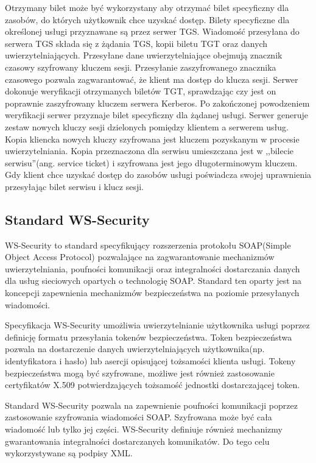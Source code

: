 			Otrzymany bilet może być wykorzystany aby otrzymać bilet specyficzny dla zasobów, do których użytkownik chce uzyskać dostęp. Bilety specyficzne dla określonej usługi przyznawane są przez serwer TGS. Wiadomość przesyłana do serwera TGS składa się z żądania TGS, kopii biletu TGT oraz danych uwierzytelniających. Przesyłane dane uwierzytelniające obejmują znacznik czasowy szyfrowany kluczem sesji. Przesyłanie zaszyfrowanego znacznika czasowego pozwala zagwarantować, że klient ma dostęp do klucza sesji. Serwer dokonuje weryfikacji otrzymanych biletów TGT, sprawdzając czy jest on poprawnie zaszyfrowany kluczem serwera Kerberos. Po zakończonej powodzeniem weryfikacji serwer przyznaje bilet specyficzny dla żądanej usługi. Serwer generuje zestaw nowych kluczy sesji dzielonych pomiędzy klientem a serwerem usług. Kopia kliencka nowych kluczy szyfrowana jest kluczem pozyskanym w procesie uwierzytelniania. Kopia przeznaczona dla serwisu umieszczana jest w ,,bilecie serwisu''(ang. service ticket) i  szyfrowana jest jego długoterminowym kluczem. Gdy klient chce uzyskać dostęp do zasobów usługi poświadcza swojej uprawnienia przesyłając bilet serwisu i klucz sesji.

	\subsection{Standard WS-Security}

		WS-Security to standard specyfikujący rozszerzenia protokołu SOAP(Simple Object Access Protocol) pozwalające na zagwarantowanie mechanizmów uwierzytelniania, poufności komunikacji oraz integralności dostarczania danych dla usług sieciowych opartych o technologię SOAP. Standard ten oparty jest na koncepcji zapewnienia mechanizmów bezpieczeństwa na poziomie przesyłanych wiadomości\cite{Hallam03}. 

		Specyfikacja WS-Security umożliwia uwierzytelnianie użytkownika usługi poprzez definicję formatu przesyłania tokenów bezpieczeństwa. Token bezpieczeństwa pozwala na dostarczenie danych uwierzytelniających użytkownika(np. identyfikatora i hasło) lub asercji opisującej tożsamości klienta usługi. Tokeny bezpieczeństwa mogą być szyfrowane, możliwe jest również zastosowanie certyfikatów X.509 potwierdzających tożsamość jednostki dostarczającej token. 

		Standard WS-Security pozwala na zapewnienie poufności komunikacji poprzez zastosowanie szyfrowania wiadomości SOAP. Szyfrowana może być cała wiadomość lub tylko jej części. WS-Security definiuje również mechanizmy gwarantowania integralności dostarczanych komunikatów. Do tego celu wykorzystywane są podpisy XML. 

